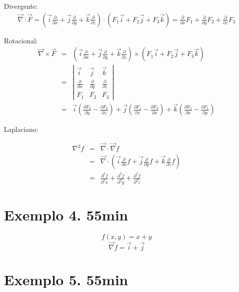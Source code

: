 \documentclass[a4paper,10pt]{article}
\begin{document}
 Divergente:
 \begin{eqnarray*}
\vec{\nabla}\cdot\vec{F}=\left(\vec{i}\frac{\partial}{\partial x}+\vec{j}\frac{\partial}{\partial y}+\vec{k}\frac{\partial}{\partial z}\right)\cdot\left(F_1\vec{i}+F_2\vec{j}+F_3\vec{k}\right)=  \frac{\partial}{\partial x}F_1+\frac{\partial}{\partial y}F_2 +\frac{\partial}{\partial z}F_3
 \end{eqnarray*}

 Rotacional:
 \begin{eqnarray*}
\vec{\nabla}\times\vec{F}&=&\left(\vec{i}\frac{\partial}{\partial x}+\vec{j}\frac{\partial}{\partial y}+\vec{k}\frac{\partial}{\partial z}\right)\times\left(F_1\vec{i}+F_2\vec{j}+F_3\vec{k}\right)\\
&=&\left|
\begin{array}{ccc}
\vec{i}&\vec{j}&\vec{k} \\
\frac{\partial}{\partial x } & \frac{\partial}{\partial y } &\frac{\partial}{\partial z } \\
F_1&F_2&F_3
\end{array}
\right|\\
&=&
\vec{i}\left(\frac{\partial F_3}{\partial y}-\frac{\partial F_2}{\partial z}\right)
+\vec{j}\left(\frac{\partial F_1}{\partial z}-\frac{\partial F_3}{\partial x}\right)
+\vec{k}\left(\frac{\partial F_2}{\partial x}-\frac{\partial F_1}{\partial y}\right)
 \end{eqnarray*}

 Laplaciano:
 
 \begin{eqnarray*}
\nabla^2f &=& \vec{\nabla}\cdot\vec{\nabla}f \\
&=&\vec{\nabla}\cdot\left( \vec{i}\frac{\partial}{\partial x}f+\vec{j}\frac{\partial}{\partial y}f +\vec{k}\frac{\partial}{\partial z}f\right)\\
&=&\frac{\partial^2 f}{\partial^2 x}+\frac{\partial^2 f}{\partial^2 y}+\frac{\partial^2 f}{\partial^2 z}
 \end{eqnarray*}

 
\section{Exemplo 4. 55min}
$$f(x,y)=x+y$$
$$\vec{\nabla}f = \vec{i} +\vec{j}$$
 
 \section{Exemplo 5. 55min}
\end{document}
